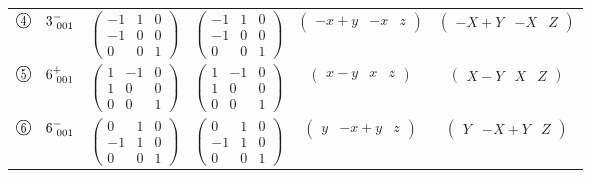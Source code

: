 \documentclass[fleqn,10pt,landscape]{jsarticle}
\begin{document}
\begin{center}
\begin{longtable}{lcccc}
$ {\ooalign{\hfil\resizebox{.8\width}{\height}{4}\hfil\crcr\raise.1ex\hbox{\large$\bigcirc$}}}\quad 3^{-}_{\,\,001} $ & $ \begin{pmatrix} -1 & 1 & 0 \\ -1 & 0 & 0 \\ 0 & 0 & 1 \end{pmatrix} $ & $ \begin{pmatrix} -1 & 1 & 0 \\ -1 & 0 & 0 \\ 0 & 0 & 1 \end{pmatrix} $ & $ \begin{pmatrix} - x + y & - x & z \end{pmatrix} $ & $ \begin{pmatrix} - X + Y & - X & Z \end{pmatrix} $ \\
$ {\ooalign{\hfil\resizebox{.8\width}{\height}{5}\hfil\crcr\raise.1ex\hbox{\large$\bigcirc$}}}\quad 6^{+}_{\,\,001} $ & $ \begin{pmatrix} 1 & -1 & 0 \\ 1 & 0 & 0 \\ 0 & 0 & 1 \end{pmatrix} $ & $ \begin{pmatrix} 1 & -1 & 0 \\ 1 & 0 & 0 \\ 0 & 0 & 1 \end{pmatrix} $ & $ \begin{pmatrix} x - y & x & z \end{pmatrix} $ & $ \begin{pmatrix} X - Y & X & Z \end{pmatrix} $ \\
$ {\ooalign{\hfil\resizebox{.8\width}{\height}{6}\hfil\crcr\raise.1ex\hbox{\large$\bigcirc$}}}\quad 6^{-}_{\,\,001} $ & $ \begin{pmatrix} 0 & 1 & 0 \\ -1 & 1 & 0 \\ 0 & 0 & 1 \end{pmatrix} $ & $ \begin{pmatrix} 0 & 1 & 0 \\ -1 & 1 & 0 \\ 0 & 0 & 1 \end{pmatrix} $ & $ \begin{pmatrix} y & - x + y & z \end{pmatrix} $ & $ \begin{pmatrix} Y & - X + Y & Z \end{pmatrix} $ \\
\end{longtable}
\end{center}
\end{document}

